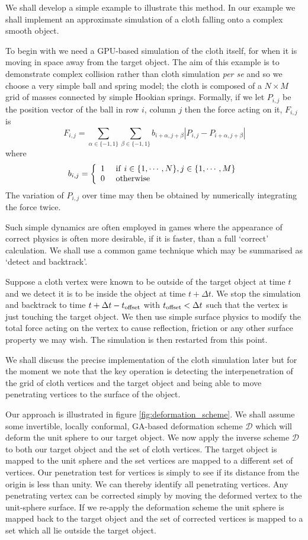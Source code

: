 We shall develop a simple example to illustrate this method. In our example we
shall implement an approximate simulation of a cloth falling onto a complex
smooth object. 

To begin with we need a GPU-based simulation of the cloth itself, for when
it is moving in space away from the target object. The aim of this example is
to demonstrate complex collision rather than cloth simulation \emph{per se}
and so we choose a very simple ball and spring model; the cloth is composed
of a $N\times M$ grid of masses connected by simple Hookian springs. Formally, 
if we let $P_{i,j}$
be the position vector of the ball in row $i$, column $j$ then the force acting
on it, $F_{i,j}$ is
\[
F_{i,j} = \sum_{\alpha \in \{-1,1\}} \sum_{\beta \in \{-1,1\}} 
b_{i+\alpha, j+\beta} 
\left| P_{i,j} - P_{i+\alpha, j+\beta} \right|
\]
where
\[
b_{i,j} = 
\left\{
\begin{array}{ll}
1 & {\rm ~if~} i \in \{1, \cdots, N\}, j \in \{1, \cdots, M\} \\
0 & {\rm ~otherwise}
\end{array}
\right.
\]
The variation of $P_{i,j}$ over time may then be obtained by numerically
integrating the force twice.

Such simple dynamics are often employed in games where the appearance of
correct physics is often more desirable, if it is faster, than a full
`correct' calculation. We shall use a common game technique
which may be summarised as `detect and backtrack'.

Suppose a cloth vertex were known to be outside of the target object at time
$t$ and we detect it is to be inside the object at time $t + \Delta t$. 
We stop the simulation and backtrack to time $t + \Delta t - t_{\rm offset}$
with $t_{\rm offset} < \Delta t$ such that the vertex is just touching
the target object. We then use simple surface physics to modify the total
force acting on the vertex to cause reflection, friction or any other 
surface property we may wish. The simulation is then restarted from this point.

We shall discuss the precise implementation of the cloth simulation later but
for the moment we note that the key operation is detecting the interpenetration
of the grid of cloth vertices and the target object and being able to move 
penetrating vertices to the surface of the object.

Our approach is illustrated in figure \ref{fig:deformation_scheme}. We shall
assume some invertible, locally conformal, GA-based deformation scheme
$\mathcal{D}$ which will deform the unit sphere to our target object.  We now
apply the inverse scheme $\mathcal{D}$ to both our target object and the set
of cloth vertices. The target object is mapped to the unit sphere and the set
vertices are mapped to a different set of vertices.  Our penetration test for
vertices is simply to see if its distance from the origin is less than unity.
We can thereby identify all penetrating vertices. Any penetrating vertex can
be corrected simply by moving the deformed vertex to the unit-sphere surface.
If we re-apply the deformation scheme the unit sphere is mapped back to the
target object and the set of corrected vertices is mapped to a set which all
lie outside the target object.

